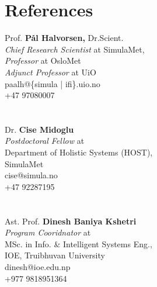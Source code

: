 \documentclass{resume}
\begin{document}
\section{References}
\begin{center}

\begin{multicols}{3}
Prof. \textbf{Pål Halvorsen,} Dr.Scient. \\
\small{\textit{Chief Research Scientist}} at SimulaMet,\\
\textit{Professor} at OsloMet \\
\textit{Adjunct Professor }at UiO\\
paalh@\{simula | ifi\}.uio.no \\
+47 97080007  \\~\\~\\


Dr. \textbf{Cise Midoglu} \\
\textit{Postdoctoral Fellow }at \\
\small{Department of Holistic Systems (HOST)}, \\
SimulaMet \\
cise@simula.no \\
+47 92287195   \\~\\~\\

Ast. Prof. \textbf{Dinesh Baniya Kshetri} \\
\textit{Program Cooridnator }at \\
\small{MSc. in Info. \& Intelligent Systems Eng.}, \\
IOE, Truibhuvan University \\
dinesh@ioe.edu.np \\
+977 9818951364 \\~\\~\\

\end{multicols}
    
\end{center}

\par\vfill\hfill{} 
\clearpage
% 
\end{document}
